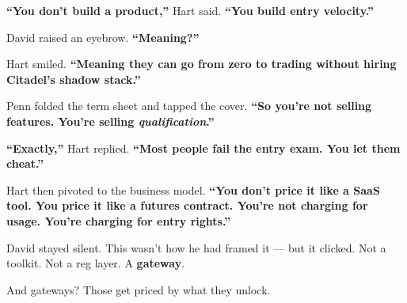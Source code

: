 \textbf{``You don’t build a product,''} Hart said. \textbf{``You build \textbf{entry velocity}.''}

David raised an eyebrow. \textbf{``Meaning?''}

Hart smiled.  
\textbf{``Meaning they can go from zero to trading without hiring Citadel’s shadow stack.''}

\medskip

Penn folded the term sheet and tapped the cover.  
\textbf{``So you’re not selling features. You’re selling \textit{qualification}.''}

\textbf{``Exactly,''} Hart replied. \textbf{``Most people fail the entry exam. You let them cheat.''}

\medskip

Hart then pivoted to the business model. \textbf{``You don’t price it like a SaaS tool. You price it like a futures contract.  
You’re not charging for usage. You’re charging for \textbf{entry rights}.''}

David stayed silent. This wasn’t how he had framed it — but it clicked.  
Not a toolkit. Not a reg layer. A \textbf{gateway}.

And gateways? Those get priced by what they unlock.

\medskip

